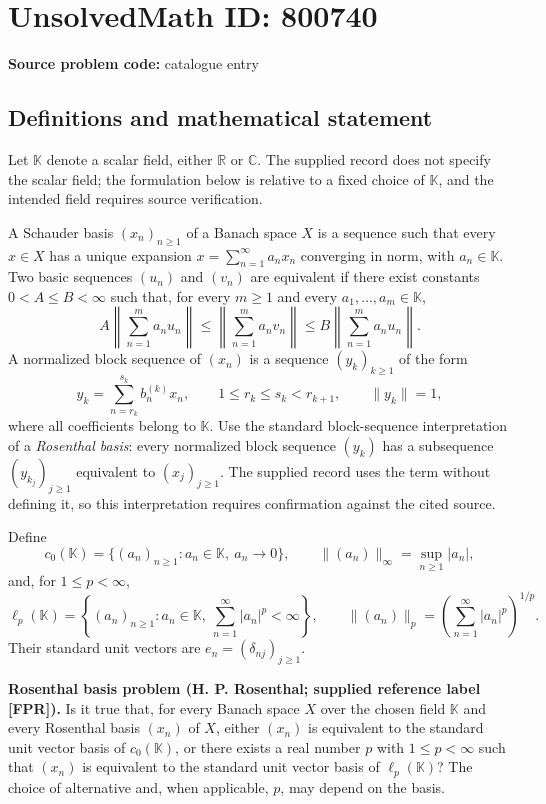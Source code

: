 \documentclass[11pt]{article}
\newcommand{\R}{\mathbb{R}}
\newcommand{\C}{\mathbb{C}}
\begin{document}
\section*{UnsolvedMath ID: 800740}
\textbf{Source problem code:} catalogue entry
\subsection{Definitions and mathematical statement}
Let \(\mathbb K\) denote a scalar field, either \(\R\) or \(\C\). The supplied record does not specify the scalar field; the formulation below is relative to a fixed choice of \(\mathbb K\), and the intended field requires source verification.

A Schauder basis \((x_n)_{n\geq 1}\) of a Banach space \(X\) is a sequence such that every \(x\in X\) has a unique expansion \(x=\sum_{n=1}^{\infty}a_nx_n\) converging in norm, with \(a_n\in\mathbb K\). Two basic sequences \((u_n)\) and \((v_n)\) are equivalent if there exist constants \(0<A\leq B<\infty\) such that, for every \(m\geq 1\) and every \(a_1,\ldots,a_m\in\mathbb K\),
\[
 A\left\|\sum_{n=1}^{m}a_nu_n\right\|
 \leq \left\|\sum_{n=1}^{m}a_nv_n\right\|
 \leq B\left\|\sum_{n=1}^{m}a_nu_n\right\|.
\]
A normalized block sequence of \((x_n)\) is a sequence \((y_k)_{k\geq 1}\) of the form
\[
 y_k=\sum_{n=r_k}^{s_k}b_n^{(k)}x_n,
 \qquad 1\leq r_k\leq s_k<r_{k+1},
 \qquad \|y_k\|=1,
\]
where all coefficients belong to \(\mathbb K\). Use the standard block-sequence interpretation of a \emph{Rosenthal basis}: every normalized block sequence \((y_k)\) has a subsequence \((y_{k_j})_{j\geq 1}\) equivalent to \((x_j)_{j\geq 1}\). The supplied record uses the term without defining it, so this interpretation requires confirmation against the cited source.

Define
\[
 c_0(\mathbb K)=\{(a_n)_{n\geq1}:a_n\in\mathbb K,\ a_n\to0\},
 \qquad \|(a_n)\|_{\infty}=\sup_{n\geq1}|a_n|,
\]
and, for \(1\leq p<\infty\),
\[
 \ell_p(\mathbb K)=\left\{(a_n)_{n\geq1}:a_n\in\mathbb K,\ \sum_{n=1}^{\infty}|a_n|^p<\infty\right\},
 \qquad \|(a_n)\|_p=\left(\sum_{n=1}^{\infty}|a_n|^p\right)^{1/p}.
\]
Their standard unit vectors are \(e_n=(\delta_{nj})_{j\geq1}\).

\textbf{Rosenthal basis problem (H. P. Rosenthal; supplied reference label [FPR]).} Is it true that, for every Banach space \(X\) over the chosen field \(\mathbb K\) and every Rosenthal basis \((x_n)\) of \(X\), either \((x_n)\) is equivalent to the standard unit vector basis of \(c_0(\mathbb K)\), or there exists a real number \(p\) with \(1\leq p<\infty\) such that \((x_n)\) is equivalent to the standard unit vector basis of \(\ell_p(\mathbb K)\)? The choice of alternative and, when applicable, \(p\), may depend on the basis.
\end{document}
